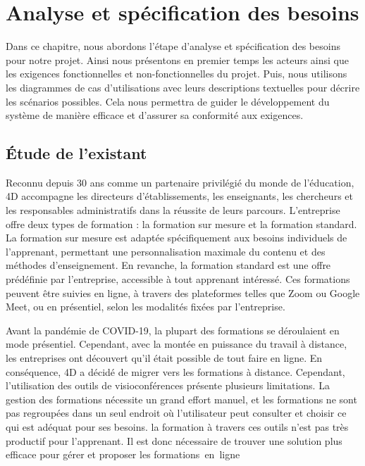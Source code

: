 
\chapter{Analyse et spécification des besoins}
\label{chap:Analyse et spécification des besoins}



Dans ce chapitre, nous abordons l’étape d’analyse et spécification des besoins pour notre projet. Ainsi nous présentons en premier temps les acteurs ainsi que les exigences fonctionnelles et non-fonctionnelles du projet. Puis, nous utilisons les diagrammes de cas d’utilisations avec leurs descriptions textuelles pour décrire les scénarios possibles. Cela nous permettra de guider le développement du système de manière efficace et d’assurer sa conformité aux exigences.

\pagebreak

\section{Étude de l’existant}

Reconnu depuis 30 ans comme un partenaire privilégié du monde de l'éducation, 4D accompagne les directeurs d'établissements, les enseignants, les chercheurs et les responsables administratifs dans la réussite de leurs parcours. L'entreprise offre deux types de formation : la formation sur mesure et la formation standard. La formation sur mesure est adaptée spécifiquement aux besoins individuels de l'apprenant, permettant une personnalisation maximale du contenu et des méthodes d'enseignement. En revanche, la formation standard est une offre prédéfinie par l'entreprise, accessible à tout apprenant intéressé. Ces formations peuvent être suivies en ligne, à travers des plateformes telles que Zoom ou Google Meet, ou en présentiel, selon les modalités fixées par l'entreprise.

Avant la pandémie de COVID-19, la plupart des formations se déroulaient en mode présentiel. Cependant, avec la montée en puissance du travail à distance, les entreprises ont découvert qu'il était possible de tout faire en ligne. En conséquence, 4D a décidé de migrer vers les formations à distance. Cependant, l'utilisation des outils de visioconférences présente plusieurs limitations. La gestion des formations nécessite un grand effort manuel, et les formations ne sont pas regroupées dans un seul endroit où l'utilisateur peut consulter et choisir ce qui est adéquat pour ses besoins. la formation à travers ces outils n'est pas très productif pour l'apprenant. Il est donc nécessaire de trouver une solution plus efficace pour gérer et proposer les formations en ligne

